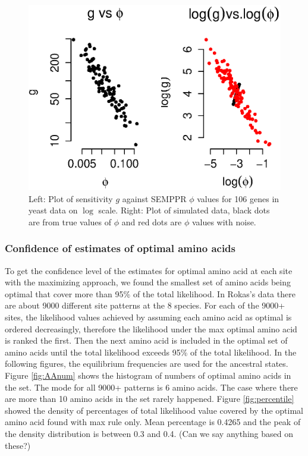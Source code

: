 \begin{figure}[h]
\centering
\includegraphics[scale=1]{g_vs_phi.eps}
\caption{Left: Plot of sensitivity $g$ against SEMPPR $\phi$ values for 106 genes in yeast data on $\log$ scale. Right: Plot of simulated data, black dots are from true values of $\phi$ and red dots are $\phi$ values with noise.}
\label{fig:gvsphi}
\end{figure}

\subsubsection{Confidence of estimates of optimal amino acids}
To get the confidence level of the estimates for optimal amino acid at each site with the maximizing approach, we found the smallest set of amino acids being optimal that cover more than 95\% of the total likelihood.
In Rokas's data there are about 9000 different site patterns at the 8 species.
For each of the 9000+ sites, the likelihood values achieved by assuming each amino acid as optimal is ordered decreasingly, therefore the likelihood under the max optimal amino acid is ranked the first.
Then the next amino acid is included in the optimal set of amino acids until the total likelihood exceeds 95\% of the total likelihood.
In the following figures, the equilibrium frequencies are used for the ancestral states.
Figure \ref{fig:AAnum} shows the histogram of numbers of optimal amino acids in the set.
The mode for all 9000+ patterns is 6 amino acids.
The case where there are more than 10 amino acids in the set rarely happened.
Figure \ref{fig:percentile} showed the density of percentages of total likelihood value covered by the optimal amino acid found with max rule only.
Mean percentage is 0.4265 and the peak of the density distribution is between 0.3 and 0.4. (Can we say anything based on these?)

